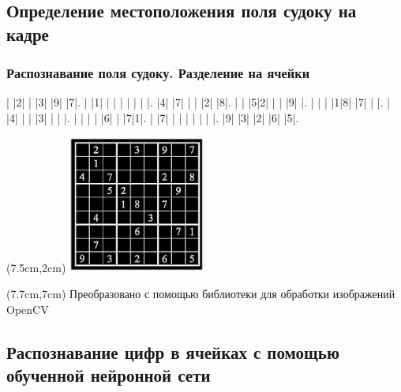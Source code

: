 \documentclass{beamer}
\begin{document}
\subsection{Определение местоположения поля судоку на кадре}
\begin{frame}
\frametitle{Распознавание поля судоку. Разделение на ячейки}

\setlength\sudokusize{6cm}
\begin{sudoku-block}
| |2| | |3| |9| |7|.
| |1| | | | | | | |.
|4| |7| | | |2| |8|.
| | |5|2| | | |9| |.
| | | |1|8| |7| | |.
| |4| | | |3| | | |.
| | | | |6| | |7|1|.
| |7| | | | | | | |.
|9| |3| |2| |6| |5|.
\end{sudoku-block}

\begin{textblock*}{4.5cm}(7.5cm,2cm)
\includegraphics[width=4.5cm]{Sudoku_example6_preprocessed.png}
\end{textblock*}

\begin{textblock*}{4.5cm}(7.7cm,7cm)
\tiny Преобразовано с помощью библиотеки для обработки изображений OpenCV
\end{textblock*}

\end{frame}


\subsection{Распознавание цифр в ячейках с помощью обученной нейронной сети}
\end{document}
